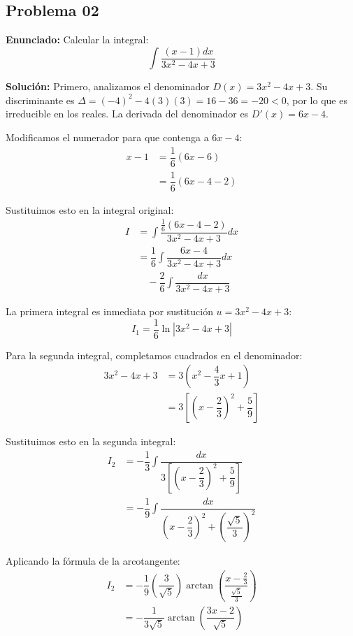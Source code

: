 \subsection*{Problema 02}

\textbf{Enunciado:} Calcular la integral:
\begin{equation*}
\int \dfrac{(x-1)dx}{3x^2 - 4x + 3}
\end{equation*}

\textbf{Solución:} 
Primero, analizamos el denominador 
$D(x) = 3x^2 - 4x + 3$. 
Su discriminante es $\Delta = (-4)^2 - 4(3)(3) = 16 - 36 = -20 < 0$, 
por lo que es irreducible en los reales. La derivada 
del denominador es $D'(x) = 6x - 4$.

Modificamos el numerador para que contenga 
a $6x - 4$:
\begin{align*}
x - 1 &= \dfrac{1}{6}(6x - 6) \\
&= \dfrac{1}{6}(6x - 4 - 2)
\end{align*}

Sustituimos esto en la integral original:
\begin{align*}
I &= \int \dfrac{\frac{1}{6}(6x - 4 - 2)}{3x^2 - 4x + 3} dx \\
&= \dfrac{1}{6} \int \dfrac{6x - 4}{3x^2 - 4x + 3} dx \\
&\quad - \dfrac{2}{6} \int \dfrac{dx}{3x^2 - 4x + 3}
\end{align*}

La primera integral es inmediata por sustitución 
$u = 3x^2 - 4x + 3$:
\begin{equation*}
I_1 = \dfrac{1}{6} \ln|3x^2 - 4x + 3|
\end{equation*}

Para la segunda integral, completamos cuadrados 
en el denominador:
\begin{align*}
3x^2 - 4x + 3 &= 3\left(x^2 - \dfrac{4}{3}x + 1\right) \\
&= 3\left[\left(x - \dfrac{2}{3}\right)^2 + \dfrac{5}{9}\right]
\end{align*}

Sustituimos esto en la segunda integral:
\begin{align*}
I_2 &= -\dfrac{1}{3} \int \dfrac{dx}{3\left[\left(x - \dfrac{2}{3}\right)^2 + \dfrac{5}{9}\right]} \\
&= -\dfrac{1}{9} \int \dfrac{dx}{\left(x - \dfrac{2}{3}\right)^2 + \left(\dfrac{\sqrt{5}}{3}\right)^2}
\end{align*}

Aplicando la fórmula de la arcotangente:
\begin{align*}
I_2 &= -\dfrac{1}{9} \left(\dfrac{3}{\sqrt{5}}\right) 
\arctan\left(\dfrac{x - \frac{2}{3}}{\frac{\sqrt{5}}{3}}\right) \\
&= -\dfrac{1}{3\sqrt{5}} \arctan\left(\dfrac{3x - 2}{\sqrt{5}}\right)
\end{align*}

